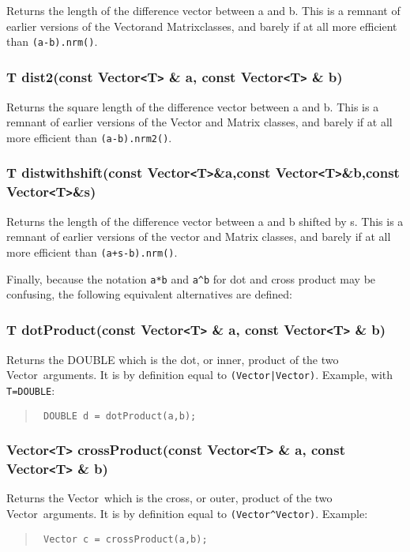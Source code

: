 \documentclass[12pt,twoside]{article}
\newcommand{\Vector}{{Vector}}
\newcommand{\Matrix}{{Matrix}}
\newcommand{\TT}{{\tt<}T{\tt>}}
\begin{document}
Returns the length of the difference vector between a and b. This is a
remnant of earlier versions of the \Vector and \Matrix classes, and
barely if at all more efficient than \texttt{(a-b).nrm()}.

\subsubsection{T dist2(const Vector\TT{} \& a, const Vector\TT{} \& b)}

Returns the square length of the difference vector between a and
b. This is a remnant of earlier versions of the Vector and Matrix
classes, and barely if at all more efficient than \texttt{(a-b).nrm2()}.  

\subsubsection{T distwithshift(const Vector\TT{}\&a,const Vector\TT{}\&b,const Vector\TT{}\&s)}

Returns the length of the difference vector between a and b shifted by
s. This is a remnant of earlier versions of the vector and Matrix
classes, and barely if at all more efficient than \texttt{(a+s-b).nrm()}.


\vspace{1cm}\pagebreak[3]
Finally, because the notation \texttt{a*b} and \texttt{a\^{}b} for dot and
cross product may be confusing, the following equivalent alternatives
are defined:
\nopagebreak
\subsubsection{T dotProduct(const Vector\TT{} \& a, const Vector\TT{} \& b)}

Returns the DOUBLE which is the dot, or inner, product of the two
\Vector\ arguments.  It is by definition equal to
\texttt{(\texttt{Vector}|\texttt{Vector})}.
Example, with {\tt T=DOUBLE}:
\begin{quote}\tt
  DOUBLE d = dotProduct(a,b);
\end{quote}

\subsubsection{Vector\TT{} crossProduct(const Vector\TT{} \& a, const Vector\TT{} \& b)}

Returns the \Vector\ which is the cross, or outer, product of the two
\Vector\ arguments.  It is by definition equal to
\texttt{(\texttt{Vector}\^{}\texttt{Vector})}.
Example:
\begin{quote}\tt
  Vector c = crossProduct(a,b);
\end{quote}
\end{document}
